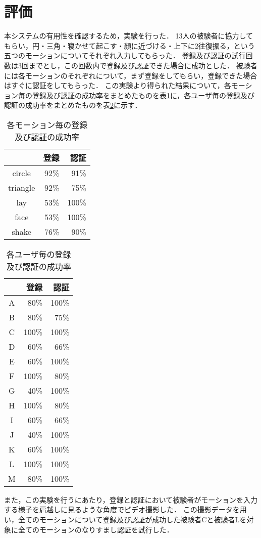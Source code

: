 \section{評価}
本システムの有用性を確認するため，実験を行った．
13人の被験者に協力してもらい，円・三角・寝かせて起こす・顔に近づける・上下に2往復振る，という五つのモーションについてそれぞれ入力してもらった．
登録及び認証の試行回数は3回までとし，この回数内で登録及び認証できた場合に成功とした．
被験者には各モーションのそれぞれについて，まず登録をしてもらい，登録できた場合はすぐに認証をしてもらった．
この実験より得られた結果について，各モーション毎の登録及び認証の成功率をまとめたものを表\ref{motion}に，各ユーザ毎の登録及び認証の成功率をまとめたものを表\ref{user}に示す．

\begin{table}[!htbp]
    \centering
    \caption{各モーション毎の登録及び認証の成功率}
    \begin{tabular}{|c|r|r|} \hline
        & 登録 & 認証 \\ \hline
        circle & 92\% & 91\% \\ \hline
        triangle & 92\%  & 75\% \\ \hline
        lay & 53\% & 100\% \\ \hline
        face & 53\% & 100\% \\ \hline
        shake & 76\% & 90\% \\ \hline
    \end{tabular}
    \label{motion}
\end{table}

\begin{table}[!htbp]
    \centering
    \caption{各ユーザ毎の登録及び認証の成功率}
    \begin{tabular}{|c|r|r|} \hline
        & 登録 & 認証 \\ \hline
        A & 80\% & 100\% \\ \hline
        B & 80\% & 75\% \\ \hline
        C & 100\% & 100\% \\ \hline
        D & 60\% & 66\% \\ \hline
        E & 60\% & 100\% \\ \hline
        F & 100\% & 80\% \\ \hline
        G & 40\% & 100\% \\ \hline
        H & 100\% & 80\% \\ \hline
        I & 60\% & 66\% \\ \hline
        J & 40\% & 100\% \\ \hline
        K & 60\% & 100\% \\ \hline
        L & 100\% & 100\% \\ \hline
        M & 80\% & 100\% \\ \hline
    \end{tabular}
    \label{user}
\end{table}

また，この実験を行うにあたり，登録と認証において被験者がモーションを入力する様子を肩越しに見るような角度でビデオ撮影した．
この撮影データを用い，全てのモーションについて登録及び認証が成功した被験者Cと被験者Lを対象に全てのモーションのなりすまし認証を試行した．

